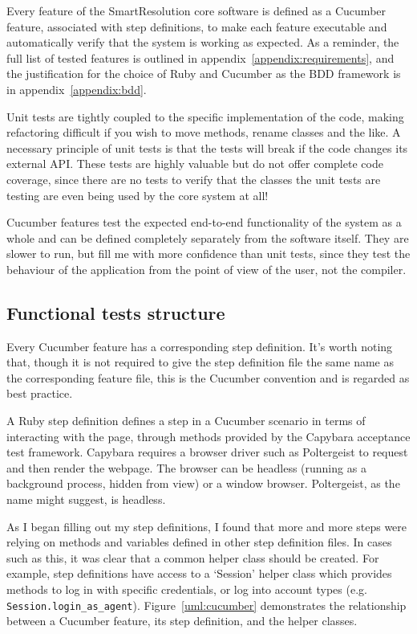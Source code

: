 Every feature of the SmartResolution core software is defined as a Cucumber feature, associated with step definitions, to make each feature executable and automatically verify that the system is working as expected. As a reminder, the full list of tested features is outlined in appendix~\ref{appendix:requirements}, and the justification for the choice of Ruby and Cucumber as the BDD framework is in appendix~\ref{appendix:bdd}.

Unit tests are tightly coupled to the specific implementation of the code, making refactoring difficult if you wish to move methods, rename classes and the like. A necessary principle of unit tests is that the tests will break if the code changes its external API. These tests are highly valuable but do not offer complete code coverage, since there are no tests to verify that the classes the unit tests are testing are even being used by the core system at all!

Cucumber features test the expected end-to-end functionality of the system as a whole and can be defined completely separately from the software itself. They are slower to run, but fill me with more confidence than unit tests, since they test the behaviour of the application from the point of view of the user, not the compiler.

\subsection{Functional tests structure}

Every Cucumber feature has a corresponding step definition. It's worth noting that, though it is not required to give the step definition file the same name as the corresponding feature file, this is the Cucumber convention and is regarded as best practice.

A Ruby step definition defines a step in a Cucumber scenario in terms of interacting with the page, through methods provided by the Capybara acceptance test framework. Capybara requires a browser driver such as Poltergeist to request and then render the webpage. The browser can be headless (running as a background process, hidden from view) or a window browser. Poltergeist, as the name might suggest, is headless.

As I began filling out my step definitions, I found that more and more steps were relying on methods and variables defined in other step definition files. In cases such as this, it was clear that a common helper class should be created. For example, step definitions have access to a `Session' helper class which provides methods to log in with specific credentials, or log into account types (e.g. \lstinline{Session.login_as_agent}). Figure~\ref{uml:cucumber} demonstrates the relationship between a Cucumber feature, its step definition, and the helper classes.

